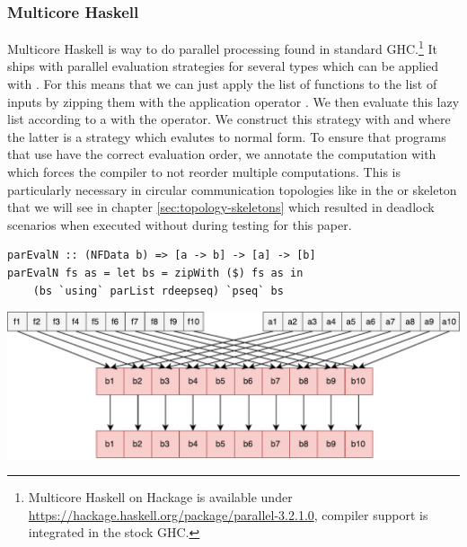 \subsubsection{Multicore Haskell}
Multicore Haskell \cite{Marlow2009,Trinder1999} is way to do parallel processing found in standard GHC.\footnote{Multicore Haskell on Hackage is available under \url{https://hackage.haskell.org/package/parallel-3.2.1.0}, compiler support is integrated in the stock GHC.} It ships with parallel evaluation strategies \cite{Trinder1998a,Marlow2010} for several types which can be applied with . For  this means that we can just apply the list of functions \code{[a -> b]} to the list of inputs \code{[a]} by zipping them with the application operator \code{\$}. We then evaluate this lazy list \code{[b]} according to a  with the  operator. We construct this strategy with  and  where the latter is a strategy which evalutes to normal form. To ensure that programs that use  have the correct evaluation order, we annotate the computation with  which forces the compiler to not reorder multiple  computations. This is particularly necessary in circular communication topologies like in the  or  skeleton that we will see in chapter \ref{sec:topology-skeletons} which resulted in deadlock scenarios when executed without  during testing for this paper.

\begin{lstlisting}[frame=htrbl]
parEvalN :: (NFData b) => [a -> b] -> [a] -> [b]
parEvalN fs as = let bs = zipWith ($) fs as in
	(bs `using` parList rdeepseq) `pseq` bs
\end{lstlisting}
\begin{center}
	\includegraphics[scale=0.5]{images/parEvalNMulticore}
\end{center} %

